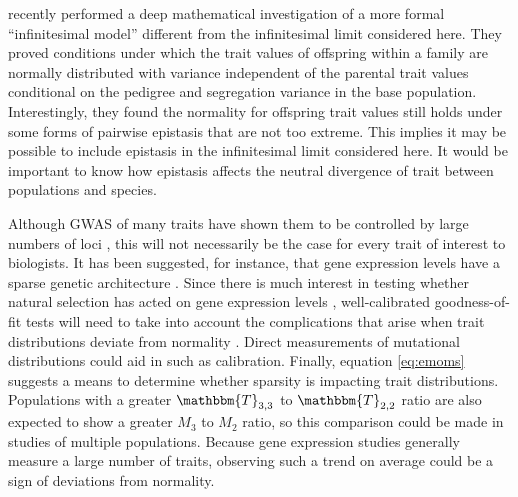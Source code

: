 \citet{Barton2017} recently performed a deep mathematical investigation of a
more formal ``infinitesimal model'' different from the infinitesimal limit
considered here. They proved conditions under which the trait values of
offspring within a family are normally distributed with variance independent of
the parental trait values conditional on the pedigree and segregation variance
in the base population. Interestingly, they found the normality for offspring
trait values still holds under some forms of pairwise epistasis that are not too
extreme. This implies it may be possible to include epistasis in the
infinitesimal limit considered here. It would be important to know how epistasis
affects the neutral divergence of trait between populations and species.

Although GWAS of many traits have shown them to be controlled by large numbers
of loci \citep{Boyle2017}, this will not necessarily be the case for every trait
of interest to biologists. It has been suggested, for instance, that gene
expression levels have a sparse genetic architecture \citep{Wheeler2016}. Since
there is much interest in testing whether natural selection has acted on gene
expression levels \citep{Whitehead2006,Gilad2006,Yang2017}, well-calibrated
goodness-of-fit tests will need to take into account the complications that
arise when trait distributions deviate from normality \citep{Khaitovich2005}.
Direct measurements of mutational distributions \citep{Gruber2012,Metzger2016}
could aid in such as calibration. Finally, equation \eqref{eq:emoms} suggests a
means to determine whether sparsity is impacting trait distributions.
Populations with a greater $\mathbbm{T}_{3,3}$ to $\mathbbm{T}_{2,2}$ ratio are
also expected to show a greater $M_3$ to $M_2$ ratio, so this comparison could
be made in studies of multiple populations. Because gene expression studies
generally measure a large number of traits, observing such a trend on average
could be a sign of deviations from normality.

